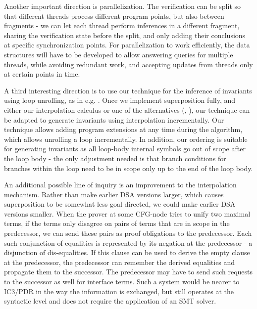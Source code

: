 Another important direction is parallelization. The verification can be split so that different threads process different program points, but also between fragments - we can let each thread perform inferences in a different fragment, sharing the verification state before the split, and only adding their conclusions at specific synchronization points. 
For parallelization to work efficiently, the data structures will have to be developed to allow answering queries for multiple threads, while avoiding redundant work, and accepting updates from threads only at certain points in time.

A third interesting direction is to use our technique for the inference of invariants using loop unrolling, as in e.g. \cite{McMillan03Interpolation}. Once we implement superposition fully, and either our interpolation calculus or one of the alternatives (\cite{BaumgartnerWaldmann13}, \cite{McMillan08}), our technique can be adapted to generate invariants using interpolation incrementally.
Our technique allows adding program extensions at any time during the algorithm, which allows unrolling a loop incrementally. 
In addition, our ordering is suitable for generating invariants as all loop-body internal symbols go out of scope after the loop body - the only adjustment needed is that branch conditions for branches within the loop need to be in scope only up to the end of the loop body.

An additional possible line of inquiry is an improvement to the interpolation mechanism.
Rather than make earlier DSA versions larger, which causes superposition to be somewhat less goal directed,
we could make earlier DSA versions smaller. 
When the prover at some CFG-node tries to unify two maximal terms, if the terms only disagree on pairs of terms that are in scope in the predecessor, we can send these pairs as proof obligations to the predecessor.
Each such conjunction of equalities is represented by its negation at the predecessor - a disjunction of dis-equalities. If this clause can be used to derive the empty clause at the predecessor, the predecessor can remember the derived equalities and propagate them to the successor. The predecessor may have to send such requests to the successor as well for interface terms. Such a system would be nearer to IC3/PDR in the way the information is exchanged, but still operates at the syntactic level and does not require the application of an SMT solver.




